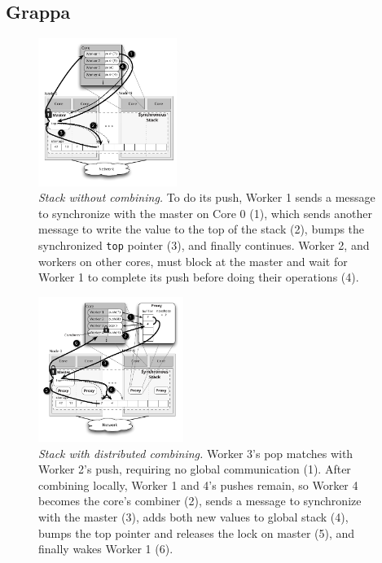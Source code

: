\subsection{Grappa}

\begin{figure}[t]
    \centering
    \includegraphics[width=0.40\textwidth]{figs/stack_nofc.pdf}
    \caption{\emph{Stack without combining.}
      To do its push, Worker 1 sends a message to synchronize with the master on Core 0 (1), which sends another message to write the value to the top of the stack (2), bumps the synchronized \texttt{top} pointer (3), and finally continues. Worker 2, and workers on other cores, must block at the master and wait for Worker 1 to complete its push before doing their operations (4).
    }
    \label{fig:stacknofc}
\end{figure}
\begin{figure}
    \centering
    \includegraphics[width=0.42\textwidth]{figs/stack_fc.pdf}
    \caption{\emph{Stack with distributed combining.}
      Worker 3's pop matches with Worker 2's push, requiring no global communication (1). After combining locally, Worker 1 and 4's pushes remain, so Worker 4 becomes the core's combiner (2), sends a message to synchronize with the master (3), adds both new values to global stack (4), bumps the top pointer and releases the lock on master (5), and finally wakes Worker 1 (6).
    }
    \label{fig:stackfc}
\end{figure}

